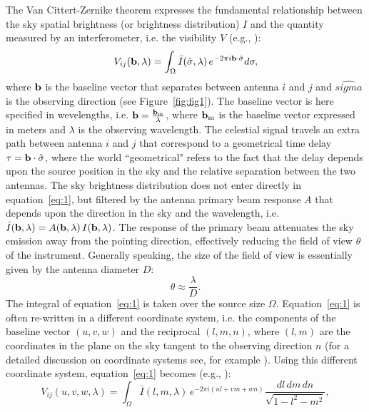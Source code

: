 The Van Cittert-Zernike theorem expresses the fundamental relationship between the sky spatial brightness (or brightness distribution) $I$ and the quantity measured by an interferometer, i.e. the visibility $V$ (e.g., \cite{TMS}):
\begin{equation}
V_{ij} ({\bf b}, \lambda) = \int_\Omega {\bar I} (\hat{\sigma}, \lambda) \, e^{-2 \pi i {\bf b} \cdot {\hat \sigma}} d {\bf \sigma},
\label{eq:1}
\end{equation}
where ${\bf b}$ is the baseline vector that separates between antenna $i$ and $j$ and $\hat{sigma}$ is the observing direction (see Figure~\ref{fig:fig1}). The baseline vector is here specified in wevelengths, i.e. ${\bf b} = \frac{{\bf b_{\rm m}}}{\lambda}$, where ${\bf b_{\rm m}}$ is the baseline vector expressed in meters and $\lambda$ is the observing wavelength. The celestial signal travels an extra path between antenna $i$ and $j$ that correspond to a geometrical time delay $\tau = {\bf b} \cdot {\hat \sigma}$, where the world ``geometrical" refers to the fact that the delay depends upon the source position in the sky and the relative separation between the two antennas.
The sky brightness distribution does not enter directly in equation~\ref{eq:1}, but filtered by the antenna primary beam response $A$ that depends upon the direction in the sky and the wavelength, i.e. ${\bar I} ({\bf b}, \lambda) = A ({\bf b}, \lambda)  \, I ({\bf b}, \lambda)$. The response of the primary beam attenuates the sky emission away from the pointing direction, effectively reducing the field of view $\theta$ of the instrument. Generally speaking, the size of the field of view is essentially given by the antenna diameter $D$: 
\begin{equation}
\theta \approx \frac{\lambda}{D}.
\label{eq:2}
\end{equation}
The integral of equation~\ref{eq:1} is taken over the source size $\Omega$. Equation~\ref{eq:1} is often re-written in a different coordinate system, i.e. the components of the baseline vector $(u,v,w)$ and the reciprocal $(l,m,n)$, where $(l,m)$ are the coordinates in the plane on the sky tangent to the observing direction $n$ (for a detailed discussion on coordinate systems see, for example \cite{TMS}). Using this different coordinate system, equation~\ref{eq:1} becomes (e.g., \cite{TMS}):
\begin{equation}
V_{ij} (u,v,w, \lambda) = \int_\Omega {\bar I} (l, m, \lambda) \, e^{-2 \pi i (ul + vm + wn)} \frac {dl \, dm \, dn}{\sqrt{1 - l^2 - m^2}},
\label{eq:3}
\end{equation}
